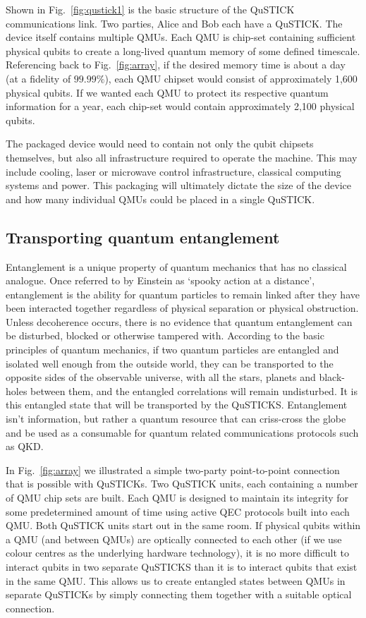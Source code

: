 \documentclass[twocolumn, aps, rmp, amsmath, amssymb, nofootinbib, superscriptaddress, longbibliography, floatfix, table-of-contents, eqsecnum]{revtex4-2}
\begin{document}
Shown in Fig.~\ref{fig:qustick1} is the basic structure of the QuSTICK communications link. Two parties, Alice and Bob each have a QuSTICK. The device itself contains multiple QMUs. Each QMU is chip-set containing sufficient physical qubits to create a long-lived quantum memory of some defined timescale. Referencing back to Fig.~\ref{fig:array}, if the desired memory time is about a day (at a fidelity of $99.99\%$), each QMU chipset would consist of approximately 1,600 physical qubits. If we wanted each QMU to protect its respective quantum information for a year, each chip-set would contain approximately 2,100 physical qubits. 

The packaged device would need to contain not only the qubit chipsets themselves, but also all infrastructure required to operate the machine. This may include cooling, laser or microwave control infrastructure, classical computing systems and power. This packaging will ultimately dictate the size of the device and how many individual QMUs could be placed in a single QuSTICK.

\subsection{Transporting quantum entanglement}

Entanglement is a unique property of quantum mechanics that has no classical analogue. Once referred to by Einstein as `spooky action at a distance', entanglement is the ability for quantum particles to remain linked after they have been interacted together regardless of physical separation or physical obstruction. Unless decoherence occurs, there is no evidence that quantum entanglement can be disturbed, blocked or otherwise tampered with. According to the basic principles of quantum mechanics, if two quantum particles are entangled and isolated well enough from the outside world, they can be transported to the opposite sides of the observable universe, with all the stars, planets and black-holes between them, and the entangled correlations will remain undisturbed. It is this entangled state that will be transported by the QuSTICKS. Entanglement isn't information, but rather a quantum resource that can criss-cross the globe and be used as a consumable for quantum related communications protocols such as QKD. 

In Fig.~\ref{fig:array} we illustrated a simple two-party point-to-point connection that is possible with QuSTICKs. Two QuSTICK units, each containing a number of QMU chip sets are built. Each QMU is designed to maintain its integrity for some predetermined amount of time using active QEC protocols built into each QMU. Both QuSTICK units start out in the same room. If physical qubits within a QMU (and between QMUs) are optically connected to each other (if we use colour centres as the underlying hardware technology), it is no more difficult to interact qubits in two separate QuSTICKS than it is to interact qubits that exist in the same QMU. This allows us to create entangled states between QMUs in separate QuSTICKs by simply connecting them together with a suitable optical connection. 
\end{document}
